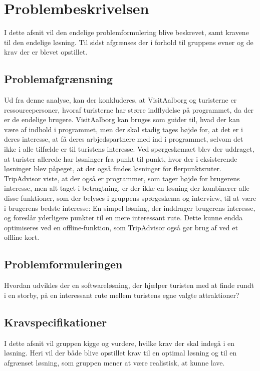 \chapter{Problembeskrivelsen}

I dette afsnit vil den endelige problemformulering blive beskrevet, samt kravene til den endelige løsning. Til sidst afgrænses der i forhold til gruppens evner og de krav der er blevet opstillet. 

\section{Problemafgrænsning}
Ud fra denne analyse, kan der konkluderes, at VisitAalborg og turisterne er ressourcepersoner, hvoraf turisterne har større indflydelse på programmet, da der er de endelige brugere. VisitAalborg kan bruges som guider til, hvad der kan være af indhold i programmet, men der skal stadig tages højde for, at det er i deres interesse, at få deres arbjedspartnere med ind i programmet, selvom det ikke i alle tilfælde er til turistens interesse.
Ved spørgeskemaet blev der uddraget, at turister allerede har løsninger fra punkt til punkt, hvor der i eksisterende løsninger blev påpeget, at der også findes løsninger for flerpunktsruter. TripAdvisor viste, at der også er programmer, som tager højde for brugerens interesse, men alt taget i betragtning, er der ikke en løsning der kombinerer alle disse funktioner, som der belyses i gruppens spørgeskema og interview, til at være i brugerens bedste interesse: En simpel løsning, der inddrager brugerens interesse, og foreslår yderligere punkter til en mere interessant rute. Dette kunne endda optimiseres ved en offline-funktion, som TripAdvisor også gør brug af ved et offline kort.

\section{Problemformuleringen}
Hvordan udvikles der en softwareløsning, der hjælper turisten med at finde rundt i en storby, på en interessant rute mellem turistens egne valgte attraktioner?

\section{Kravspecifikationer}
I dette afsnit vil gruppen kigge og vurdere, hvilke krav der skal indegå i en løsning. Heri vil der både blive opstillet krav til en optimal løsning og til en afgrænset løsning, som gruppen mener at være realistisk, at kunne lave.

